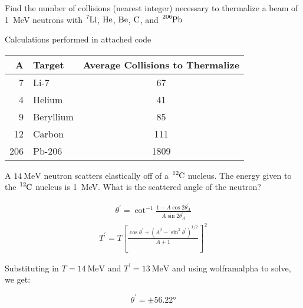 \documentclass{hw}
\begin{document}
Find the number of collisions (nearest integer) necessary to thermalize a beam of \SI{1}{\mega\electronvolt} neutrons with $\ce{^{7}Li}$, $\ce{He}$, $\ce{Be}$, $\ce{C}$, and $\ce{^{206}Pb}$

\solution
Calculations performed in attached code

\begin{tabular}{rlc}
\toprule
A &     Target &  Average Collisions to Thermalize \\
\midrule
7 &       Li-7 &                                67 \\
4 &     Helium &                                41 \\
9 &  Beryllium &                                85 \\
12 &     Carbon &                               111 \\
206 &     Pb-206 &                              1809 \\
\bottomrule
\end{tabular}


\problem{}
A $\SI{14}{\mega\electronvolt}$ neutron scatters elastically off of a $\ce{^{12}C}$ nucleus. The energy given to the $\ce{^{12}C}$ nucleus is \SI{1}{\mega\electronvolt}. What is the scattered angle of the neutron?

\solution
\begin{align*}
	\theta^\prime = \cot^{-1} \frac{1 - A \cos{2 \theta_A^\prime}}{A \sin{ 2 \theta_A^\prime}}
\end{align*}
\begin{align*}
	T^\prime = T \left[ \frac{\cos{\theta^\prime} + \left( A^2 - \sin^2 \theta^\prime \right)^{1/2}}{A + 1} \right]^2
\end{align*}

Substituting in $T=\SI{14}{\mega\electronvolt}$ and $T^\prime=\SI{13}{\mega\electronvolt}$ and using wolframalpha to solve, we get:

\[
	\theta^\prime = \pm \ang{56.22}
\]
\end{document}
